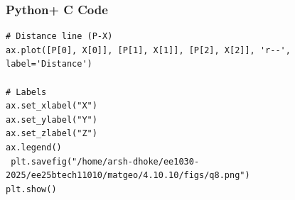 \documentclass{beamer}
\begin{document}
\begin{frame}[fragile]
    \frametitle{Python+ C Code}
\begin{lstlisting}
# Distance line (P-X)
ax.plot([P[0], X[0]], [P[1], X[1]], [P[2], X[2]], 'r--', label='Distance')

# Labels
ax.set_xlabel("X")
ax.set_ylabel("Y")
ax.set_zlabel("Z")
ax.legend()
 plt.savefig("/home/arsh-dhoke/ee1030-2025/ee25btech11010/matgeo/4.10.10/figs/q8.png")
plt.show()

\end{lstlisting}
\end{frame}
\end{document}
